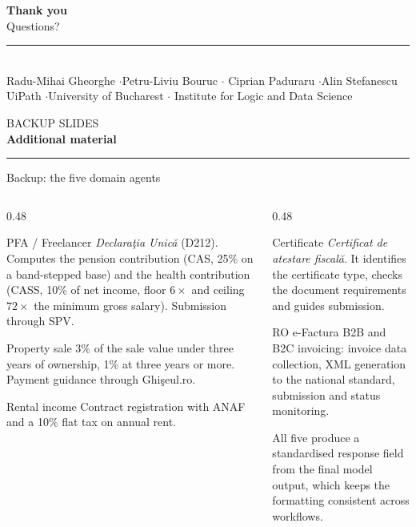 \documentclass[aspectratio=169,10pt]{beamer}
\newif\ifbackupslide
\newcommand{\cmt}[1]{{\color{stone}\small #1}}          %
\newcommand{\keypart}[2]{%
  \begin{frame}[plain, noframenumbering]
    \vfill
    \centering
    {\color{stone}\small #1}\\[0.35em]
    {\color{teal}\Large\bfseries #2}\\[0.9em]
    {\color{rust}\rule{0.25\paperwidth}{1.2pt}}
    \vfill\vfill
  \end{frame}%
}
\begin{document}
\begin{frame}
  \vfill
  \centering
  {\color{teal}\Large\bfseries Thank you}\\[0.6em]
  Questions?\\[1.4em]

  {\color{rust}\rule{0.86\paperwidth}{2pt}}\\[1.3em]

  {\small Radu-Mihai Gheorghe \quad$\cdot$\quad Petru-Liviu Bouruc \quad$\cdot$\quad
   Ciprian Paduraru \quad$\cdot$\quad Alin Stefanescu}\\[0.4em]
  {\small UiPath \quad$\cdot$\quad University of Bucharest \quad$\cdot$\quad
   Institute for Logic and Data Science}
  \vfill
\end{frame}

\appendix
\backupslidetrue
\keypart{BACKUP SLIDES}{Additional material}

\begin{frame}[noframenumbering]{Backup: the five domain agents}
  \begin{columns}[T]
    \begin{column}{0.48\textwidth}
      \begin{block}{PFA / Freelancer}
        \small \emph{Declara\c{t}ia Unic\u{a}} (D212). Computes the pension contribution
        (CAS, 25\% on a band-stepped base) and the health contribution (CASS, 10\% of net
        income, floor $6\times$ and ceiling $72\times$ the minimum gross salary). Submission
        through SPV.
      \end{block}
      \begin{block}{Property sale}
        \small 3\% of the sale value under three years of ownership, 1\% at three years or
        more. Payment guidance through Ghi\c{s}eul.ro.
      \end{block}
      \begin{block}{Rental income}
        \small Contract registration with ANAF and a 10\% flat tax on annual rent.
      \end{block}
    \end{column}
    \begin{column}{0.48\textwidth}
      \begin{block}{Certificate}
        \small \emph{Certificat de atestare fiscal\u{a}}. It identifies the certificate type,
        checks the document requirements and guides submission.
      \end{block}
      \begin{block}{RO e-Factura}
        \small B2B and B2C invoicing: invoice data collection, XML generation to the national
        standard, submission and status monitoring.
      \end{block}
      \medskip
      \cmt{All five produce a standardised response field from the final model output, which
      keeps the formatting consistent across workflows.}
    \end{column}
  \end{columns}
\end{frame}
\end{document}
